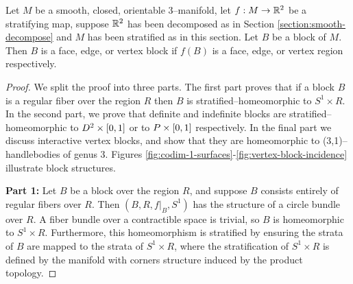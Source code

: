 \begin{theorem}
	\label{thm:block-structure}
	Let $M$ be a smooth, closed, orientable 3--manifold, let $f:M\to\mathbb{R}^2$ be a stratifying map, suppose $\mathbb{R}^2$ has been decomposed as in Section \ref{section:smooth-decompose} and $M$ has been stratified as in this section.
	Let $B$ be a block of $M$.
	Then $B$ is a face, edge, or vertex block if $f(B)$ is a face, edge, or vertex region respectively.
\end{theorem}

\begin{proof}
	We split the proof into three parts.
	The first part proves that if a block $B$ is a regular fiber over the region $R$ then $B$ is stratified--homeomorphic to $S^1\times R$.
	In the second part, we prove that definite and indefinite blocks are stratified--homeomorphic to $D^2\times[0,1]$ or to $P\times[0,1]$ respectively.
	In the final part we discuss interactive vertex blocks, and show that they are homeomorphic to (3,1)--handlebodies of genus 3.
	Figures \ref{fig:codim-1-surfaces}-\ref{fig:vertex-block-incidence} illustrate block structures.
	
	\textbf{Part 1:}
	Let $B$ be a block over the region $R$, and suppose $B$ consists entirely of regular fibers over $R$.
	Then $(B, R, f|_B, S^1)$ has the structure of a circle bundle over $R$.
	A fiber bundle over a contractible space is trivial, so $B$ is homeomorphic to $S^1 \times R$.
	Furthermore, this homeomorphism is stratified by ensuring the strata of $B$ are mapped to the strata of $S^1 \times R$, where the stratification of $S^1 \times R$ is defined by the manifold with corners structure induced by the product topology.
	

\end{proof}
